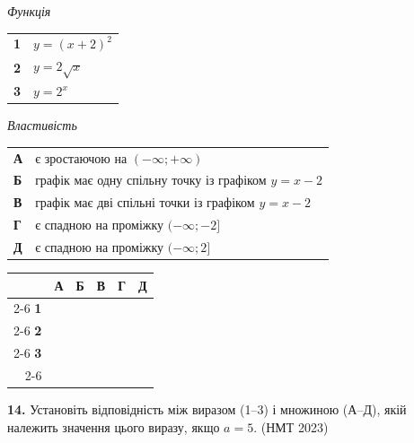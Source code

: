 \documentclass[14pt]{extarticle}
\newcommand{\answerGrid}{
    \begingroup
    \setlength{\tabcolsep}{4pt}
    \renewcommand{\arraystretch}{1.2}
    \small
    \begin{tabular}{r|c|c|c|c|c|}
         \multicolumn{1}{c}{} & \multicolumn{1}{c}{\textbf{А}} & \multicolumn{1}{c}{\textbf{Б}} & \multicolumn{1}{c}{\textbf{В}} & \multicolumn{1}{c}{\textbf{Г}} & \multicolumn{1}{c}{\textbf{Д}} \\ \cline{2-6}
         \textbf{1} & & & & & \\ \cline{2-6}
         \textbf{2} & & & & & \\ \cline{2-6}
         \textbf{3} & & & & & \\ \cline{2-6}
    \end{tabular}
    \endgroup
}
\newcommand{\nmtyear}[1]{\hfill{\small\color{yearcolor}(НМТ #1)}}
\begin{document}
\noindent
\begin{minipage}[t]{0.45\textwidth}
    \textit{Функція} \par \vspace{0.2cm}
    \begin{tabular}{@{}p{0.5cm} l@{}}
    \textbf{1} & $y = (x + 2)^2$ \\[0.4cm]
    \textbf{2} & $y = 2\sqrt{x}$ \\[0.4cm]
    \textbf{3} & \colorbox{yellow!30}{$y = 2^x$} \\
    \end{tabular}
\end{minipage}%
\hfill
\begin{minipage}[t]{0.50\textwidth}
    \textit{Властивість} \par \vspace{0.2cm}
    \begin{tabular}{@{}p{0.5cm} p{7cm}@{}}
    \textbf{А} & є зростаючою на $(-\infty; +\infty)$ \\[0.2cm]
    \textbf{Б} & графік має одну спільну точку із графіком $y = x - 2$ \\[0.2cm]
    \textbf{В} & графік має дві спільні точки із графіком $y = x - 2$ \\[0.2cm]
    \textbf{Г} & є спадною на проміжку $(-\infty; -2]$ \\[0.2cm]
    \textbf{Д} & є спадною на проміжку $(-\infty; 2]$ \\
    \end{tabular}
\end{minipage}
\vspace{0.3cm}

\answerGrid
\vspace{0.7cm}

\noindent\textbf{14.} Установіть відповідність між виразом (1–3) і множиною (А–Д), якій належить значення цього виразу, якщо $a = 5$. \nmtyear{2023}
\vspace{0.3cm}
\end{document}
